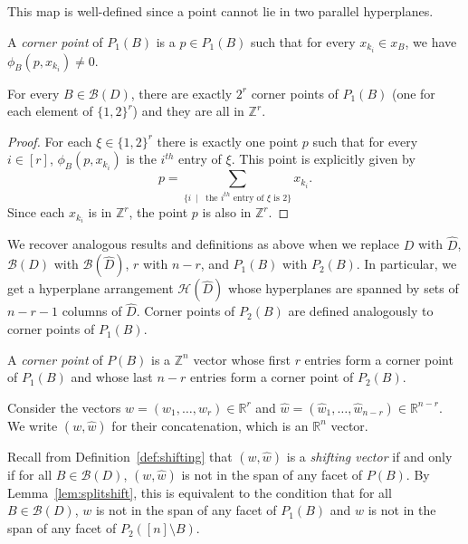 \documentclass[ALCO,ThmDefs,Unicode,epreuves]{cedram}
\newcommand{\R}{\mathbb{R}}
\newcommand{\Z}{\mathbb{Z}}
\newcommand{\B}{\mathcal{B}}
\newcommand{\CB}{x_B}
\newcommand{\colB}[1]{x_{k_{#1}}}
\begin{document}
This map is well-defined since a point cannot lie in two parallel hyperplanes. 

\begin{defi}\label{def:corner}
A \emph{corner point} of $P_1(B)$ is a $p \in P_1(B)$ such that for every $\colB i \in \CB$, we have $\phi_B(p,\colB i) \not= 0$.
\end{defi}

\begin{lemma}
For every $B \in \B(D)$, there are exactly $2^r$ corner points of $P_1(B)$ (one for each element of $\{1,2\}^r$) and they are all in $\Z^r$. 
\end{lemma}
\begin{proof}
For each $\xi \in \{1,2\}^r$ there is exactly one point $p$ such that for every $i \in [r]$, $\phi_B(p,\colB i)$ is the $i^{th}$ entry of $\xi$. This point is explicitly given by
\[
p = \sum_{\{i~\mid ~\text{ the $i^{th}$ entry of $\xi$ is $2$}\}} \colB i.
\]
Since each $\colB i$ is in $\Z^r$, the point $p$ is also in $\Z^r$. 
\end{proof}


We recover analogous results and definitions as above when we replace $D$ with $\widehat D$, $\B(D)$ with $\B(\widehat D)$, $r$ with $n-r$, and $P_1(B)$ with $P_2(B)$. In particular, we get a hyperplane arrangement $\mathcal H(\widehat D)$ whose hyperplanes are spanned by sets of $n-r-1$ columns of $\widehat D$. Corner points of $P_2(B)$ are defined analogously to corner points of $P_1(B)$.

\begin{defi}
A \emph{corner point} of $P(B)$ is a $\Z^n$ vector whose first $r$ entries form a corner point of $P_1(B)$ and whose last $n-r$ entries form a corner point of $P_2(B)$. 
\end{defi}

Consider the vectors $w = (w_1,\dots,w_r) \in \R^r$ and $\widehat w = (\widehat w_1,\dots, \widehat w_{n-r})\in \R^{n-r}$. We write $(w,\widehat w)$ for their concatenation, which is an $\R^n$ vector. 

Recall from Definition~\ref{def:shifting} that $(w,\widehat w)$ is a \emph{shifting vector} if and only if for all $B \in \B(D)$, $(w,\widehat w)$ is not in the span of any facet of $P(B)$. By Lemma~\ref{lem:splitshift}, this is equivalent to the condition that for all $B \in \B(D)$, $w$ is not in the span of any facet of $P_1(B)$ and $\widehat w$ is not in the span of any facet of $P_2([n] \setminus B)$.
\end{document}
